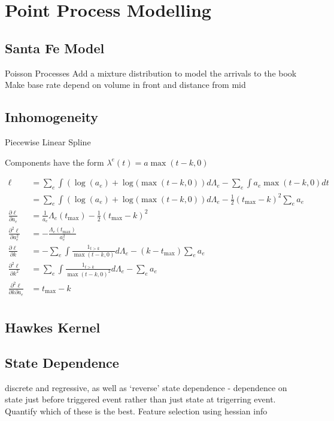 \documentclass[honours,12pt]{unswthesis}
\numberwithin{equation}{section}
\begin{document}
\section{Point Process Modelling}
\subsection{Santa Fe Model}
Poisson Processes
Add a mixture distribution to model the arrivals to the book
Make base rate depend on volume in front and distance from mid
\subsection{Inhomogeneity}

Piecewise Linear Spline

Components have the form $\lambda^e(t) = a\max(t-k,0)$

\begin{equation*}
	\begin{align}
		\ell &= \sum_e \int \left(\log(a_e) + \log(\max(t-k,0)\right) d\Lambda_e - \sum_e \int a_e\max(t-k,0) dt \\
			&= \sum_e \int \left(\log(a_e) + \log(\max(t-k,0)\right) d\Lambda_e - \frac{1}{2}(t_\mathrm{max} -k)^2\sum_e a_e \\
		\frac{\partial\ell}{\partial a_e} &= \frac{1}{a_e} \Lambda_e(t_\mathrm{max}) - \frac{1}{2}(t_\mathrm{max}-k)^2\\ 
		\frac{\partial^2 \ell}{\partial a_e ^2} &= -\frac{\Lambda_e(t_\mathrm{max})}{a_e^2}\\
		\frac{\partial\ell}{\partial k} &= -\sum_e \int \frac{1_{t>k}}{\max(t-k,0)} d\Lambda_e - (k-t_\mathrm{max})\sum_e a_e \\
		\frac{\partial^2\ell}{\partial k^2} &= \sum_e \int \frac{1_{t>k}}{\max(t-k,0)^2} d\Lambda_e - \sum_e a_e \\
		\frac{\partial^2\ell}{\partial k\partial a_e} &= t_\mathrm{max}-k\\
	\end{align}
\end{equation*}

\subsection{Hawkes Kernel}
\subsection{State Dependence}
discrete and regressive, as well as `reverse' state dependence - dependence on state just before triggered event rather than just state at trigerring event. Quantify which of these is the best. Feature selection using hessian info
\end{document}
